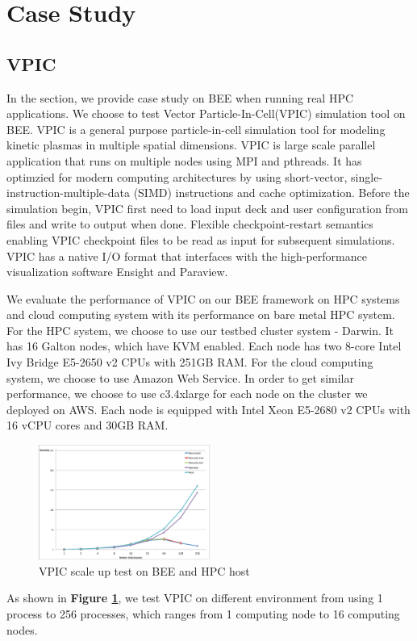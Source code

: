 \section{Case Study}
  \label{sec:case_study}
  \subsection{VPIC}
  In the section, we provide case study on BEE when running real HPC applications. We choose to test Vector Particle-In-Cell(VPIC) simulation tool \cite{bowers20080, bowers2008ultrahigh, bowers2009advances} on BEE. VPIC is a general purpose particle-in-cell simulation tool for modeling kinetic plasmas in multiple spatial dimensions. VPIC is large scale parallel application that runs on multiple nodes using MPI and pthreads. It has optimzied for modern computing architectures by using short-vector, single-instruction-multiple-data (SIMD) instructions and cache optimization. Before the simulation begin, VPIC first need to load input deck and user configuration from files and write to output when done. Flexible checkpoint-restart semantics enabling VPIC checkpoint files to be read as input for subsequent simulations. VPIC has a native I/O format that interfaces with the high-performance visualization software Ensight and Paraview. 

We evaluate the performance of VPIC on our BEE framework on HPC systems and cloud computing system with  its performance on bare metal HPC system. For the HPC system, we choose to use our testbed cluster system - Darwin. It has 16 Galton nodes, which have KVM enabled. Each node has two 8-core Intel Ivy Bridge E5-2650 v2 CPUs with 251GB RAM. For the cloud computing system, we choose to use Amazon Web Service. In order to get similar performance, we choose to use c3.4xlarge for each node on the cluster we deployed on AWS. Each node is equipped with Intel Xeon E5-2680 v2 CPUs with 16 vCPU cores and 30GB RAM. 


\begin{figure}[h]
    \centering
    \caption{VPIC scale up test on BEE and HPC host}
    \label{vpic-test}
    \includegraphics[width=0.5\textwidth]{figures/vpic-test.pdf}
\end{figure}

As shown in \textbf{Figure \ref{vpic-test}}, we test VPIC on different environment from using 1 process to 256 processes, which ranges from 1 computing node to 16 computing nodes. 

